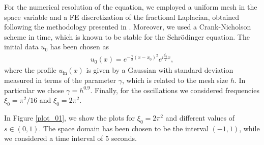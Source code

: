 \documentclass[10pt]{article}
\begin{document}
For the numerical resolution of the equation, we employed a uniform mesh in the space variable and a FE discretization of the fractional Laplacian, obtained following the methodology presented in \cite{biccari2017controllability}. Moreover, we used a Crank-Nicholson scheme in time, which is known to be stable for the Schr\"odinger equation. The initial data $u_0$ has been chosen as  
\begin{align*}
	u_0(x) = e^{-\frac \gamma2 (x-x_0)^2}e^{i\frac {\xi_0}{\varepsilon} x},
\end{align*} 
where the profile $u_{\textrm{in}}(x)$ is given by a Gaussian with standard deviation measured in terms of the parameter $\gamma$, which is related to the mesh size $h$. In particular we chose $\gamma = h^{0.9}$. Finally, for the oscillations we considered frequencies $\xi_0=\pi^2/16$ and $\xi_0=2\pi^2$.   

In Figure \ref{plot_01}, we show the plots for $\xi_0=2\pi^2$ and different values of $s\in(0,1)$. The space domain has been chosen to be the interval $(-1,1)$, while we considered a time interval of $5$ seconds. 
\end{document}
